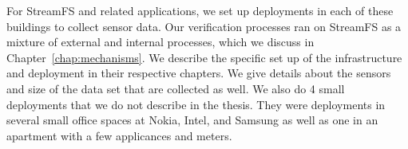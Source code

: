 For StreamFS and related applications, we set up deployments in each of these buildings to collect sensor data.  Our verification
processes ran on StreamFS as a mixture of external and internal processes, which we discuss in Chapter~\ref{chap:mechanisms}.
We describe the specific set up of the infrastructure and deployment in their respective chapters.  We give details 
about the sensors and size of the data set that are collected as well.
We also do 4 small deployments that we do not describe in the thesis.  They were deployments in several small office spaces at 
Nokia, Intel, and Samsung as well as one in an apartment with a few applicances and meters.





